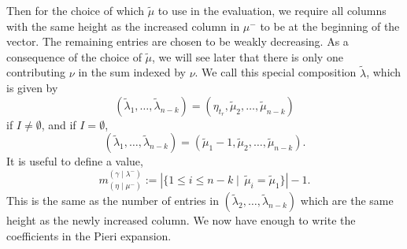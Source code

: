\documentclass[ALCO]{cedram}
\newcommand{\gammalambdamin}{{(\gamma \mid \lambda^-)}}
\newcommand{\etamu}{{(\eta \mid \mu^-)}}
\newcommand{\mutilde}{{\widetilde{\mu}}}
\newcommand{\lambdatilde}{{\widetilde{\lambda}}}
\newcommand{\mIone}{m_{\etamu}^{\gammalambdamin}}
\begin{document}
Then for the choice of which $\mutilde$ to use in the evaluation, we require all columns with the same height as the increased column in $\mu^-$ to be at the beginning of the vector. The remaining entries are chosen to be weakly decreasing. As a consequence of the choice of $\mutilde$, we will see later that there is only one contributing $\nu$ in the sum indexed by $\nu$. We call this special composition $\lambdatilde$, which is given by
\[(\lambdatilde_1,  \dotsc, \lambdatilde_{n-k}) = (\eta_{t_r}, \mutilde_2, \dotsc, \mutilde_{n-k}) \]
if $I\neq \emptyset$, and if $I = \emptyset$,
\[ (\lambdatilde_1, \dotsc, \lambdatilde_{n-k}) = (\mutilde_1-1, \mutilde_2, \dotsc, \mutilde_{n-k}).\]
It is useful to define a value,
 \[\mIone := |\{ 1\leq i \leq n-k \mid \, \mutilde_i = \mutilde_1  \}|-1. \]
This is the same as the number of entries in $(\lambdatilde_2,\dotsc, \lambdatilde_{n-k})$ which are the same height as the newly increased column. We now have enough to write the coefficients in the Pieri expansion.
\end{document}
